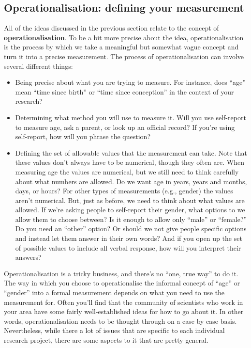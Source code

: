 \documentclass[
]{book}
\providecommand{\tightlist}{%
  \setlength{\itemsep}{0pt}\setlength{\parskip}{0pt}}
\begin{document}
\hypertarget{operationalisation-defining-your-measurement}{%
\subsection{Operationalisation: defining your measurement}\label{operationalisation-defining-your-measurement}}

All of the ideas discussed in the previous section relate to the concept of {\textbf{operationalisation}}. To be a bit more precise about the idea, operationalisation is the process by which we take a meaningful but somewhat vague concept and turn it into a precise measurement. The process of operationalisation can involve several different things:

\begin{itemize}
\tightlist
\item
  Being precise about what you are trying to measure. For instance, does ``age'' mean ``time since birth'' or ``time since conception'' in the context of your research?
\item
  Determining what method you will use to measure it. Will you use self-report to measure age, ask a parent, or look up an official record? If you're using self-report, how will you phrase the question?
\item
  Defining the set of allowable values that the measurement can take. Note that these values don't always have to be numerical, though they often are. When measuring age the values are numerical, but we still need to think carefully about what numbers are allowed. Do we want age in years, years and months, days, or hours? For other types of measurements (e.g., gender) the values aren't numerical. But, just as before, we need to think about what values are allowed. If we're asking people to self-report their gender, what options to we allow them to choose between? Is it enough to allow only ``male'' or ``female?'' Do you need an ``other'' option? Or should we not give people specific options and instead let them answer in their own words? And if you open up the set of possible values to include all verbal response, how will you interpret their answers?
\end{itemize}

Operationalisation is a tricky business, and there's no ``one, true way'' to do it. The way in which you choose to operationalise the informal concept of ``age'' or ``gender'' into a formal measurement depends on what you need to use the measurement for. Often you'll find that the community of scientists who work in your area have some fairly well-established ideas for how to go about it. In other words, operationalisation needs to be thought through on a case by case basis. Nevertheless, while there a lot of issues that are specific to each individual research project, there are some aspects to it that are pretty general.
\end{document}
